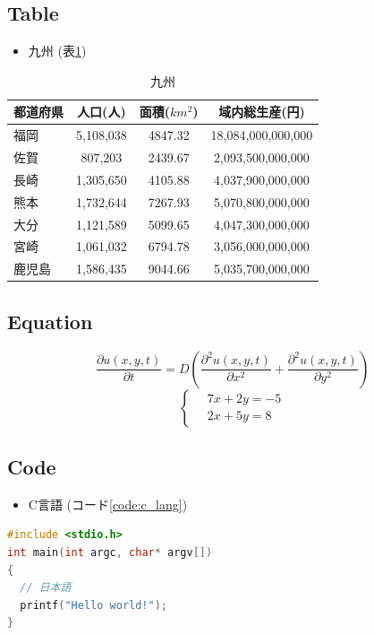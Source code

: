 \subsection{Table}
\begin{itemize}
	\item 九州 (表\ref{table:kyusyu})
\end{itemize}
\begin{table}[htbp]
	\centering
	\caption{九州}
	\label{table:kyusyu}
	\begin{tabular}{|l|c|c|c|}
		\hline
		都道府県 & 人口(人)  & 面積(\(km^2\)) & 域内総生産(円)     \\ \hline \hline
		福岡     & 5,108,038 & 4847.32        & 18,084,000,000,000 \\ \hline
		佐賀     & 807,203   & 2439.67        & 2,093,500,000,000  \\ \hline
		長崎     & 1,305,650 & 4105.88        & 4,037,900,000,000  \\ \hline
		熊本     & 1,732,644 & 7267.93        & 5,070,800,000,000  \\ \hline
		大分     & 1,121,589 & 5099.65        & 4,047,300,000,000  \\ \hline
		宮崎     & 1,061,032 & 6794.78        & 3,056,000,000,000  \\ \hline
		鹿児島   & 1,586,435 & 9044.66        & 5,035,700,000,000  \\ \hline
	\end{tabular}
\end{table}

\subsection{Equation}
\begin{equation}
	\frac{\partial u\left(x,y,t\right)}{\partial t}
	= D \left(\frac{{\partial}^2 u\left(x,y,t\right)}{\partial{x}^2}
	+ \frac{\partial^2 u\left(x,y,t\right)}{\partial y^2}\right)
\end{equation}
\begin{equation}
	\left\{ \,
	\begin{aligned}
		 & 7x + 2y = -5 \\
		 & 2x + 5y = 8
	\end{aligned}
	\right.
\end{equation}

\subsection{Code}
\begin{itemize}
	\item C言語 (コード\ref{code:c_lang})
\end{itemize}
\begin{lstlisting}[language={c},caption={C言語},label={code:c_lang}]
#include <stdio.h>
int main(int argc, char* argv[])
{
  // 日本語
  printf("Hello world!");
}
\end{lstlisting}


